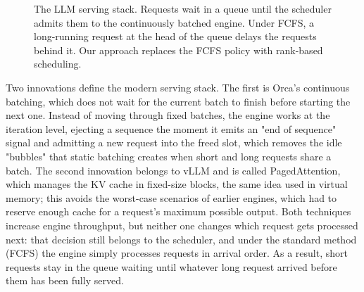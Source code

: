 \documentclass[conference]{IEEEtran}
\begin{document}
\begin{figure}[htbp]
\centering
{}
\caption{
The LLM serving stack. Requests wait in a queue until the
scheduler admits them to the continuously batched engine.
Under FCFS, a long-running request at the head of the queue
delays the requests behind it. Our approach replaces the
FCFS policy with rank-based scheduling.
}
\label{fig:llm-serving-stack}
\end{figure}

 Two innovations define the modern serving stack. The first is Orca's continuous batching, which does not wait for the current batch to finish before starting the next one. Instead of moving through fixed batches, the engine works at the iteration level, ejecting a sequence the moment it emits an "end of sequence" signal and admitting a new request into the freed slot, which removes the idle "bubbles" that static batching creates when short and long requests share a batch. The second innovation belongs to vLLM and is called PagedAttention, which manages the KV cache in fixed-size blocks, the same idea used in virtual memory; this avoids the worst-case scenarios of earlier engines, which had to reserve enough cache for a request's maximum possible output. Both techniques increase engine throughput, but neither one changes which request gets processed next: that decision still belongs to the scheduler, and under the standard method (FCFS) the engine simply processes requests in arrival order. As a result, short requests stay in the queue waiting until whatever long request arrived before them has been fully served.
\end{document}
